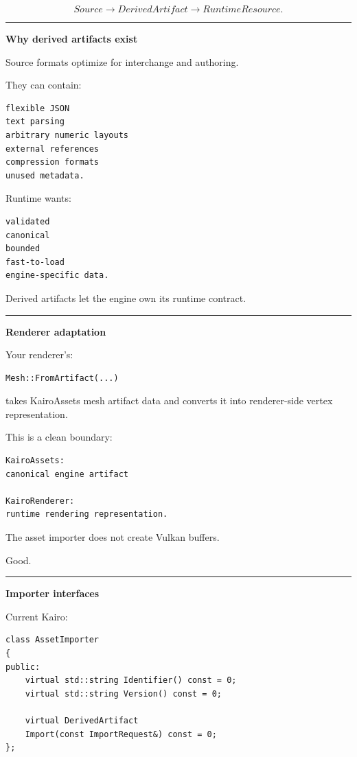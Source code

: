 \[
\boxed{
Source
\rightarrow
DerivedArtifact
\rightarrow
RuntimeResource.
}
\]

\begin{center}\rule{0.5\linewidth}{0.5pt}\end{center}

\textbf{Why derived artifacts exist}

Source formats optimize for interchange and authoring.

They can contain:

\begin{verbatim}
flexible JSON
text parsing
arbitrary numeric layouts
external references
compression formats
unused metadata.
\end{verbatim}

Runtime wants:

\begin{verbatim}
validated
canonical
bounded
fast-to-load
engine-specific data.
\end{verbatim}

Derived artifacts let the engine own its runtime contract.

\begin{center}\rule{0.5\linewidth}{0.5pt}\end{center}

\textbf{Renderer adaptation}

Your renderer's:

\begin{verbatim}
Mesh::FromArtifact(...)
\end{verbatim}

takes KairoAssets mesh artifact data and converts it into renderer-side vertex representation.

This is a clean boundary:

\begin{verbatim}
KairoAssets:
canonical engine artifact

KairoRenderer:
runtime rendering representation.
\end{verbatim}

The asset importer does not create Vulkan buffers.

Good.

\begin{center}\rule{0.5\linewidth}{0.5pt}\end{center}

\textbf{Importer interfaces}

Current Kairo:

\begin{verbatim}
class AssetImporter
{
public:
    virtual std::string Identifier() const = 0;
    virtual std::string Version() const = 0;

    virtual DerivedArtifact
    Import(const ImportRequest&) const = 0;
};
\end{verbatim}

